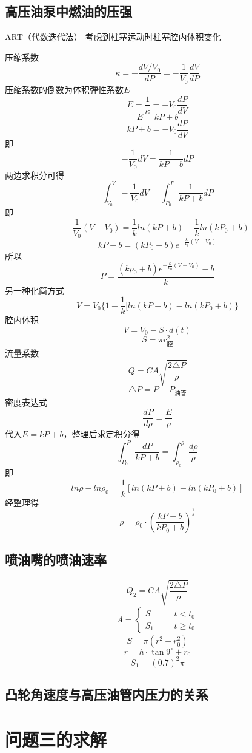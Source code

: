 \documentclass[withoutpreface,bwprint]{cumcmthesis} %
\begin{document}
\subsection{高压油泵中燃油的压强}
    {\color{red}ART（代数迭代法）}
    考虑到柱塞运动时柱塞腔内体积变化

压缩系数
$$
    \kappa = -\frac{dV/V_0}{dP}=-\frac{1}{V_0}\frac{dV}{dP}
$$
压缩系数的倒数为体积弾性系数$E$
$$
    E=\frac{1}{\kappa}=-V_0\frac{dP}{dV}
$$
$$
    E=kP+b
$$
$$
    kP+b=-V_0\frac{dP}{dV}
$$
即
$$
-\frac{1}{V_0}dV=\frac{1}{kP+b}dP
$$
两边求积分可得
$$
\int_{V_0}^V-\frac{1}{V_0}dV=\int_{P_0}^P\frac{1}{kP+b}dP
$$
即
$$
    -\frac{1}{V_0}(V-V_0)=\frac{1}{k}ln(kP+b)-\frac{1}{k}ln(kP_0+b)
$$
$$
    kP+b=(kP_0+b)e^{-\frac{k}{V_0}(V-V_0)}
$$
所以
$$
    P=\frac{(k\rho_0+b)e^{-\frac{k}{V_0}(V-V_0)}-b}{k}
$$
另一种化简方式
$$
    V=V_0\{1-\frac{1}{k}[ln(kP+b)-ln(kP_0+b)\}
$$
腔内体积
$$
    V=V_0-S \cdot d(t)
$$
$$
    S=\pi r_{\text{腔}}^2
$$
流量系数
$$
    Q=CA\sqrt{\frac{2 \triangle P}{\rho}}
$$
$$
    \triangle P=P-P_{\text{油管}}
$$
密度表达式
$$
    \frac{dP}{d\rho}=\frac{E}{\rho}
$$
代入$E=kP+b$，整理后求定积分得
$$
    \int_{P_0}^P\frac{dP}{kP+b}=\int_{\rho_0}^\rho\frac{d\rho}{\rho}
$$
即
$$
    ln\rho-ln\rho_0=\frac{1}{k}[ln(kP+b)-ln(kP_0+b)]
$$
经整理得
$$
    \rho=\rho_0\cdot(\frac{kP+b}{kP_0+b})^{\frac{1}{k}}
$$

\subsection{喷油嘴的喷油速率}
$$
    Q_2=CA\sqrt{\frac{2 \triangle P}{\rho}}
$$
\begin{eqnarray}
    A=
    \begin{cases}
        S \quad \quad & t<t_0 \\
        S_1    & t \geq t_0
    \end{cases}
\end{eqnarray}
$$
    S=\pi(r^2-r_0^2)
$$
$$
    r=h\cdot\tan 9^\circ + r_0
$$
$$
    S_1=(0.7)^2\pi
$$



\subsection{凸轮角速度与高压油管内压力的关系}


\section{问题三的求解}
\end{document}
